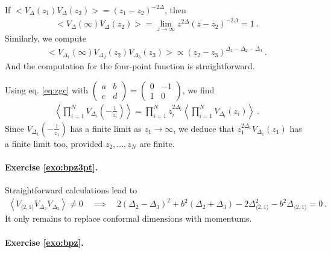 \documentclass[12pt, a4paper]{article}
\theoremstyle{break}
\begin{document}
If $\Big<V_\Delta(z_1)V_\Delta(z_2)\Big> = (z_1-z_2)^{-2\Delta}$, then
\begin{align}
 \Big<V_\Delta(\infty)V_\Delta(z_2)\Big> = \lim_{z\to\infty} z^{2\Delta}(z-z_2)^{-2\Delta}=1 \ .
\end{align}
Similarly, we compute 
\begin{align}
 \Big<V_{\Delta_1}(\infty)V_{\Delta_2}(z_2)V_{\Delta_3}(z_3)\Big> \propto (z_2-z_3)^{\Delta_1-\Delta_2-\Delta_3}\ .
\end{align}
And the computation for the four-point function is straightforward.

Using eq. \eqref{eq:zgc} with $\left(\begin{smallmatrix} a & b \\ c & d \end{smallmatrix} \right) = \left(\begin{smallmatrix} 0 & -1 \\ 1 & 0 \end{smallmatrix}\right)$, we find 
\begin{align}
 \left< \prod_{i=1}^N  V_{\Delta_i}\left(-\tfrac{1}{z_i}\right) \right>
 = \prod_{i=1}^N z_i^{2\Delta_i} \left< \prod_{i=1}^N V_{\Delta_i}(z_i) \right>\ .
\end{align}
Since $V_{\Delta_1}(-\frac{1}{z_1})$ has a finite limit as $z_1\to \infty$, we deduce that $z_1^{2\Delta_1}V_{\Delta_1}(z_1)$ has a finite limit too, provided $z_2,\dots, z_N$ are finite.


\paragraph{Exercise \ref{exo:bpz3pt}.} 

Straightforward calculations lead to 
\begin{align}
 \left< V_{\langle 2, 1 \rangle} V_{\Delta_2} V_{\Delta_3} \right> \neq 0 \quad \implies \quad 
 2(\Delta_2-\Delta_3)^2 +b^2(\Delta_2+\Delta_3) -2\Delta_{\langle 2, 1 \rangle}^2 -b^2\Delta_{\langle 2, 1 \rangle} = 0\ .
 \end{align}
 It only remains to replace conformal dimensions with momentums.

\paragraph{Exercise \ref{exo:bpz}.}
\end{document}
